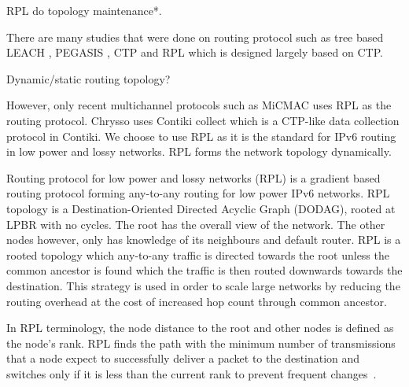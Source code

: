 RPL do topology maintenance*.

There are many studies that were done on routing protocol such as tree based LEACH \cite{leach}, PEGASIS \cite{pegasis}, CTP \cite{ctp} and RPL which is designed largely based on CTP.

Dynamic/static routing topology?


However, only recent multichannel protocols such as MiCMAC uses RPL as the routing protocol. Chrysso uses Contiki collect which is a CTP-like data collection protocol in Contiki. We choose to use RPL as it is the standard for IPv6 routing in low power and lossy networks. RPL forms the network topology dynamically.

Routing protocol for low power and lossy networks (RPL) is a gradient based routing protocol forming any-to-any routing for low power IPv6 networks. RPL topology is a Destination-Oriented Directed Acyclic Graph (DODAG), rooted at LPBR with no cycles. The root has the overall view of the network. The other nodes however, only has knowledge of its neighbours and default router. RPL is a rooted topology which any-to-any traffic is directed towards the root unless the common ancestor is found which the traffic is then routed downwards towards the destination. This strategy is used in order to scale large networks by reducing the routing overhead at the cost of increased hop count through common ancestor. 

In RPL terminology, the node distance to the root and other nodes is defined as the node's rank. RPL finds the path with the minimum number of transmissions that a node expect to successfully deliver a packet to the destination and switches only if it is less than the current rank to prevent frequent changes~\cite{mrhof}. 




